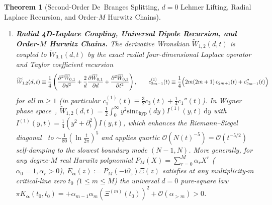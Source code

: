 \documentclass[11pt,reqno]{amsart}
\newtheorem{theorem}{Theorem}[section]
\theoremstyle{definition}
\theoremstyle{remark}
\numberwithin{equation}{section}
\newcommand{\dd}{\mathrm{d}}
\newcommand{\ii}{\mathrm{i}}
\newcommand{\sinch}{\mathrm{sinc}_{\mathrm{hyp}}}
\begin{document}
\begin{theorem}[Second-Order De~Branges Splitting, $d=0$ Lehmer Lifting, Radial Laplace Recursion, and Order-$M$ Hurwitz Chains]
\begin{enumerate}[label=\textup{(\roman*)},leftmargin=2.2em]
\begin{equation}\label{eq:intro_d0_limit}
\pi\,K_{\alpha,\beta}(t,t) \equiv \alpha\Bigl(\bigl(\Xi'(t)\bigr)^2 - \Xi(t)\Xi''(t)\Bigr) + \alpha\beta\Bigl(\bigl(\Xi''(t)\bigr)^2 - \Xi'(t)\Xi'''(t)\Bigr) = \alpha\,c_1(t) + \alpha\beta\,c_1^{(1)}(t).
\end{equation}
At any critical-line extremum $t_{\mathrm{mid}}$ ($\Xi'(t_{\mathrm{mid}}) = 0$) between a closely spaced Lehmer pair $t_\pm = t_{\mathrm{mid}} \pm \delta$ ($\delta > 0$), the product $-\Xi'(t_{\mathrm{mid}})\Xi'''(t_{\mathrm{mid}}) \equiv 0$ vanishes identically, so $\pi K_{\alpha,\beta}(t_{\mathrm{mid}}, t_{\mathrm{mid}}) \equiv -\alpha\Xi(t_{\mathrm{mid}})\Xi''(t_{\mathrm{mid}}) + \alpha\beta(\Xi''(t_{\mathrm{mid}}))^2 \xrightarrow{\delta \to 0} +\alpha\beta(\Xi''(t_0))^2 > 0$ remains strictly positive on $d = 0$ itself at order $d^0$. Globally along $d = 0$, pure squares interlock across zeros $\gamma_k$ ($c_1(\gamma_k) = (\Xi'(\gamma_k))^2 > 0$), extrema $\tau_k$ ($c_1^{(1)}(\tau_k) = (\Xi''(\tau_k))^2 > 0$), and inflection points $\nu_k$ ($c_1(\nu_k) = (\Xi'(\nu_k))^2 > 0$).
\item \textbf{Radial 4D-Laplace Coupling, Universal Dipole Recursion, and Order-$M$ Hurwitz Chains.} The derivative Wronskian $\widetilde{W}_{1,2}(d,t)$ is coupled to $\widetilde{W}_{0,1}(d,t)$ by the exact radial four-dimensional Laplace operator and Taylor coefficient recursion
\begin{equation}\label{eq:intro_laplace_recursion}
\widetilde{W}_{1,2}(d,t) \equiv \frac{1}{4}\left(\frac{\partial^2\widetilde{W}_{0,1}}{\partial d^2} + \frac{2}{d}\frac{\partial\widetilde{W}_{0,1}}{\partial d} + \frac{\partial^2\widetilde{W}_{0,1}}{\partial t^2}\right), \qquad c_{2m-1}^{(1)}(t) \equiv \frac{1}{4}\Bigl(2m(2m+1)\,c_{2m+1}(t) + c_{2m-1}''(t)\Bigr)
\end{equation}
for all $m \ge 1$ (in particular $c_1^{(1)}(t) \equiv \frac{3}{2}c_3(t) + \frac{1}{4}c_1''(t)$). In Wigner phase space~\cite{wigner1932,hudson1974}, $\widetilde{W}_{1,2}(d,t) = \frac{1}{2}\int_0^\infty y^2\sinch(dy)I^{(1)}(y,t)\,\dd y$ with $I^{(1)}(y,t) = \frac{1}{4}(y^2 + \partial_t^2)I(y,t)$, which enhances the Riemann--Siegel diagonal~\cite{siegel1932,gabcke1979} to $\sim \frac{1}{80}(\ln\frac{t}{2\pi})^5$ and applies quartic $\mathcal{O}(N(t)^{-5}) = \mathcal{O}(t^{-5/2})$ self-damping to the slowest boundary mode $(N-1, N)$. More generally, for any degree-$M$ real Hurwitz polynomial $P_M(X) = \sum_{r=0}^M \alpha_r X^r$ ($\alpha_0 = 1, \alpha_r > 0$), $E_{\boldsymbol{\alpha}}(z) := P_M(-\ii\partial_z)\Xi(z)$ satisfies at any multiplicity-$m$ critical-line zero $t_0$ ($1 \le m \le M$) the universal $d = 0$ pure-square law $\pi K_{\boldsymbol{\alpha}}(t_0, t_0) = +\alpha_{m-1}\alpha_m(\Xi^{(m)}(t_0))^2 + \mathcal{O}(\alpha_{>m}) > 0$.
\end{enumerate}
\end{theorem}
\end{document}
